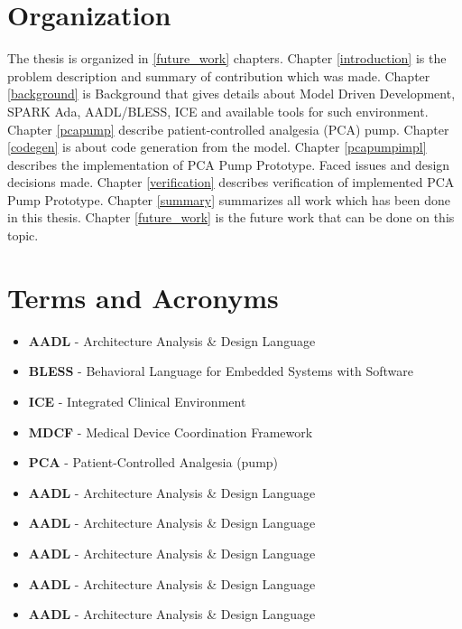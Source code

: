 \section{Organization}
\label{introduction:organization}
The thesis is organized in \ref{future_work} chapters. 
Chapter \ref{introduction} is the problem description and summary of contribution which was made. 
Chapter \ref{background} is Background that gives details about Model Driven Development, SPARK Ada, AADL/BLESS, ICE and available tools for such environment. 
Chapter \ref{pcapump} describe patient-controlled analgesia (PCA) pump.
Chapter \ref{codegen} is about code generation from the model. 
Chapter \ref{pcapumpimpl} describes the implementation of PCA Pump Prototype. Faced issues and design decisions made.
Chapter \ref{verification} describes verification of implemented PCA Pump Prototype. 
Chapter \ref{summary} summarizes all work which has been done in this thesis. 
Chapter \ref{future_work} is the future work that can be done on this topic.


\section{Terms and Acronyms}
\label{introduction:terms}

\begin{itemize}
	\item \textbf{AADL} - Architecture Analysis \& Design Language
	\item \textbf{BLESS} - Behavioral Language for Embedded Systems with Software
	\item \textbf{ICE} - Integrated Clinical Environment
	\item \textbf{MDCF} - Medical Device Coordination Framework
	\item \textbf{PCA} - Patient-Controlled Analgesia (pump)
	\item \textbf{AADL} - Architecture Analysis \& Design Language
	\item \textbf{AADL} - Architecture Analysis \& Design Language
	\item \textbf{AADL} - Architecture Analysis \& Design Language
	\item \textbf{AADL} - Architecture Analysis \& Design Language
	\item \textbf{AADL} - Architecture Analysis \& Design Language
\end{itemize}